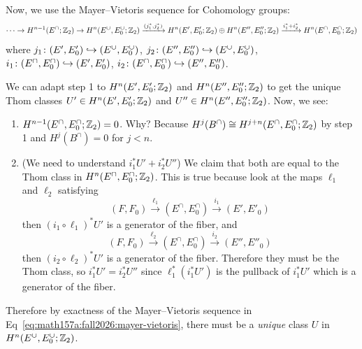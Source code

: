 \begin{node}
Now, we use the Mayer--Vietoris sequence for Cohomology groups:
\begin{equation}\label{eq:math157a:fall2026:mayer-vietoris}
\dots\to H^{n-1}(E^{\cap};\mathbb{Z}_{2})\to H^{n}(E^{\cup},E^{\cup}_{0};\mathbb{Z}_{2})\xrightarrow{(j_{1}^{*},j_{2}^{*})}H^{n}(E',E'_{0};\mathbb{Z}_{2})\oplus
H^{n}(E'',E''_{0};\mathbb{Z}_{2})\xrightarrow{i_{1}^{*}+i_{2}^{*}}H^{n}(E^{\cap},E^{\cap}_{0};\mathbb{Z}_{2})
\end{equation}
where $j_{1}\colon(E',E'_{0})\hookrightarrow(E^{\cup},E^{\cup}_{0})$,
 $j_{2}\colon(E'',E''_{0})\hookrightarrow(E^{\cup},E^{\cup}_{0})$,
 $i_{1}\colon(E^{\cap},E^{\cap}_{0})\hookrightarrow(E',E'_{0})$,
 $i_{2}\colon(E^{\cap},E^{\cap}_{0})\hookrightarrow(E'',E''_{0})$.
\end{node}

\begin{node}
We can adapt step 1 to $H^{n}(E',E'_{0};\mathbb{Z}_{2})$ and $H^{n}(E'',E''_{0};\mathbb{Z}_{2})$
to get the unique Thom classes $U'\in H^{n}(E',E'_{0};\mathbb{Z}_{2})$
and $U''\in H^{n}(E'',E''_{0};\mathbb{Z}_{2})$. Now, we see:
\begin{enumerate}
\item $H^{n-1}(E^{\cap},E^{\cap}_{0};\mathbb{Z}_{2})=0$. Why? Because
  $H^{j}(B^{\cap})\cong H^{j+n}(E^{\cap},E^{\cap}_{0};\mathbb{Z}_{2})$ by step
  1 and $H^{j}(B^{\cap})=0$ for $j<n$.
\item (We need to understand $i_{1}^{*}U' + i_{2}^{*}U''$) We claim
  that both are equal to the Thom class in $H^{n}(E^{\cap},E^{\cap}_{0};\mathbb{Z}_{2})$.
  This is true because look at the maps $\ell_{1}$ and $\ell_{2}$ satisfying
\begin{equation}
(F,F_{0})\xrightarrow{\ell_{1}}(E^{\cap},E^{\cap}_{0})\xrightarrow{i_{1}}(E',E'_{0})
\end{equation}
then $(i_{1}\circ\ell_{1})^{*}U'$ is a generator of the fiber, and
\begin{equation}
(F,F_{0})\xrightarrow{\ell_{2}}(E^{\cap},E^{\cap}_{0})\xrightarrow{i_{2}}(E'',E''_{0})
\end{equation}
then $(i_{2}\circ\ell_{2})^{*}U'$ is a generator of the
fiber. Therefore they must be the Thom class, so $i_{1}^{*}U'=i_{2}^{*}U''$
since $\ell_{1}^{*}(i_{1}^{*}U')$ is the pullback of $i_{1}^{*}U'$
which is a generator of the fiber.
\end{enumerate}
Therefore by exactness of the Mayer--Vietoris sequence in
Eq~\eqref{eq:math157a:fall2026:mayer-vietoris}, there must be a
\emph{unique} class $U$ in $H^{n}(E^{\cup},E^{\cup}_{0};\mathbb{Z}_{2})$. 
\end{node}

